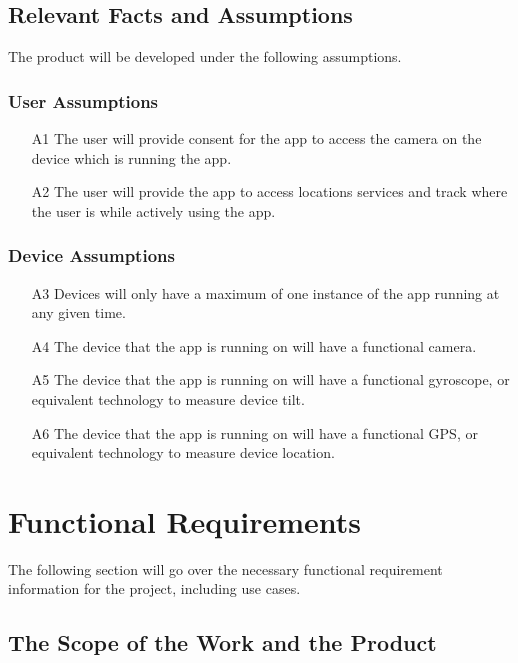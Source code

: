 \documentclass[12pt]{article}
\begin{document}
\subsection{Relevant Facts and Assumptions}
The product will be developed under the following assumptions.

\subsubsection{User Assumptions}
\begin{itemize}
    \item [A1] The user will provide consent for the app to access the camera on the device which is running the app. 
    \item [A2] The user will provide the app to access locations services and track where the user is while actively using the app. 
\end{itemize}

\subsubsection{Device Assumptions}
\begin{itemize}
    \item [A3] Devices will only have a maximum of one instance of the app running at any given time. 
    \item [A4] The device that the app is running on will have a functional camera. 
    \item [A5] The device that the app is running on will have a functional gyroscope, or equivalent technology to measure device tilt. 
    \item [A6] The device that the app is running on will have a functional GPS, or equivalent technology to measure device location. 
\end{itemize}

\section{Functional Requirements}
The following section will go over the necessary functional requirement information for the project, including use cases. 
\subsection{The Scope of the Work and the Product}
\end{document}
